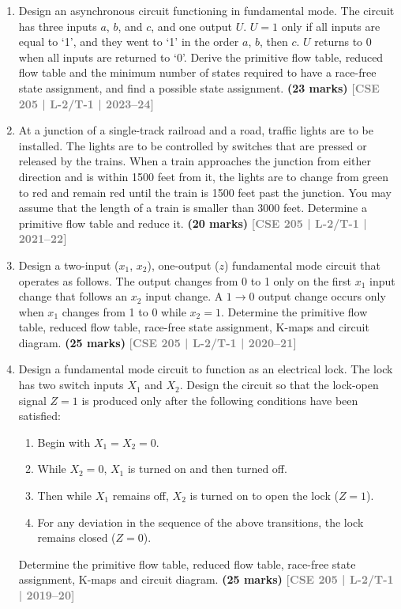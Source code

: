 \documentclass[12pt,a3paper]{article}
\newcommand{\yr}[1]{\hfill\textcolor{gray}{\small\textbf{[#1]}}}
\newcommand{\mk}[1]{\textcolor{orange!70!black}{\small\textbf{(#1 marks)}}}
\begin{document}
\begin{enumerate}

\item Design an asynchronous circuit functioning in fundamental mode. The circuit has three inputs $a$, $b$, and $c$, and one output $U$. $U=1$ only if all inputs are equal to `1', and they went to `1' in the order $a$, $b$, then $c$. $U$ returns to 0 when all inputs are returned to `0'. Derive the primitive flow table, reduced flow table and the minimum number of states required to have a race-free state assignment, and find a possible state assignment.
\mk{23} \yr{CSE 205 | L-2/T-1 | 2023--24}

\item At a junction of a single-track railroad and a road, traffic lights are to be installed. The lights are to be controlled by switches that are pressed or released by the trains. When a train approaches the junction from either direction and is within 1500 feet from it, the lights are to change from green to red and remain red until the train is 1500 feet past the junction. You may assume that the length of a train is smaller than 3000 feet. Determine a primitive flow table and reduce it.
\mk{20} \yr{CSE 205 | L-2/T-1 | 2021--22}

\item Design a two-input ($x_1$, $x_2$), one-output ($z$) fundamental mode circuit that operates as follows. The output changes from 0 to 1 only on the first $x_1$ input change that follows an $x_2$ input change. A $1\to0$ output change occurs only when $x_1$ changes from 1 to 0 while $x_2=1$. Determine the primitive flow table, reduced flow table, race-free state assignment, K-maps and circuit diagram.
\mk{25} \yr{CSE 205 | L-2/T-1 | 2020--21}


\item Design a fundamental mode circuit to function as an electrical lock. The lock has two switch inputs $X_1$ and $X_2$. Design the circuit so that the lock-open signal $Z=1$ is produced only after the following conditions have been satisfied:
\begin{enumerate}
  \item Begin with $X_1 = X_2 = 0$.
  \item While $X_2 = 0$, $X_1$ is turned on and then turned off.
  \item Then while $X_1$ remains off, $X_2$ is turned on to open the lock ($Z=1$).
  \item For any deviation in the sequence of the above transitions, the lock remains closed ($Z=0$).
\end{enumerate}
Determine the primitive flow table, reduced flow table, race-free state assignment, K-maps and circuit diagram.
\mk{25} \yr{CSE 205 | L-2/T-1 | 2019--20}



\end{enumerate}
\end{document}
